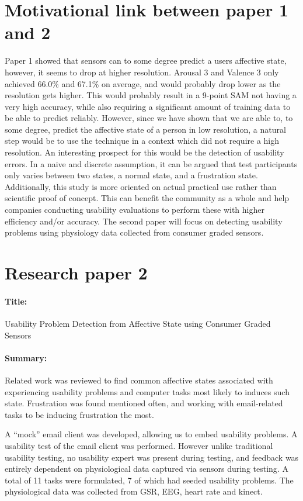 \section{Motivational link between paper 1 and 2}
Paper 1 showed that sensors can to some degree predict a users affective state, however, it seems to drop at higher resolution. 
Arousal 3 and Valence 3 only achieved 66.0\% and 67.1\% on average, and would probably drop lower as the resolution gets higher. 
This would probably result in a 9-point SAM not having a very high accuracy, while also requiring a significant amount of training data to be able to predict reliably.
However, since we have shown that we are able to, to some degree, predict the affective state of a person in low resolution, a natural step would be to use the technique in a context which did not require a high resolution. 
An interesting prospect for this would be the detection of usability errors.
In a naive and discrete assumption, it can be argued that test participants only varies between two states, a normal state, and a frustration state.
Additionally, this study is more oriented on actual practical use rather than scientific proof of concept. 
This can benefit the community as a whole and help companies conducting usability evaluations to perform these with higher efficiency and/or accuracy.
The second paper will focus on detecting usability problems using physiology data collected from consumer graded sensors.

\section{Research paper 2}
\paragraph{Title:}
Usability Problem Detection from Affective State using Consumer Graded Sensors
\paragraph{Summary:}
Related work was reviewed to find common affective states associated with experiencing usability problems and computer
tasks most likely to induces such state. Frustration was found mentioned often, and working with email-related tasks to
be inducing frustration the most.

A ``mock'' email client was developed, allowing us to embed usability problems. A usability test of the email client was performed. 
However unlike traditional usability testing, no usability
expert was present during testing, and feedback was entirely dependent on physiological data captured via sensors during
testing.  A total of 11 tasks were formulated, 7 of which had seeded usability problems.  The physiological data
was collected from GSR, EEG, heart rate and kinect.  

